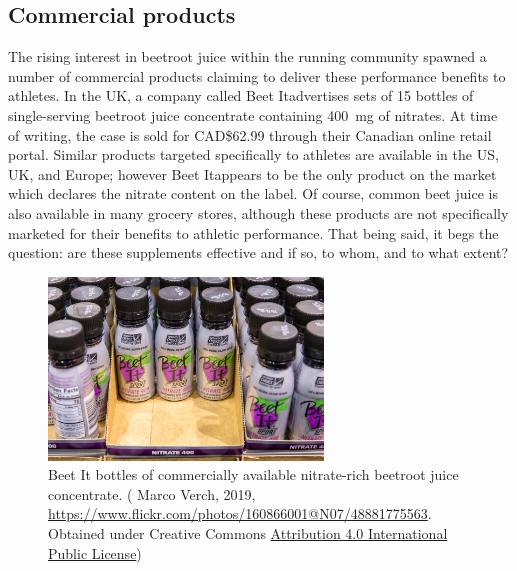     \subsection{Commercial products}
The rising interest in beetroot juice within the running community spawned a number of commercial products claiming to deliver these performance benefits to athletes. In the UK, a company called Beet It\textregistered advertises sets of 15 bottles of single-serving beetroot juice concentrate containing \SI{400}{mg} of nitrates. At time of writing, the case is sold for CAD\$62.99 through their Canadian online retail portal. Similar products targeted specifically to athletes are available in the US, UK, and Europe; however Beet It\textregistered appears to be the only product on the market which declares the nitrate content on the label. Of course, common beet juice is also available in many grocery stores, although these products are not specifically marketed for their benefits to athletic performance. That being said, it begs the question: are these supplements effective and if so, to whom, and to what extent?
\begin{figure}
    \centering
    \includegraphics[width=0.65\textwidth]{assets/beetit.jpg}
    \caption{Beet It\textregistered{} bottles of commercially available nitrate-rich beetroot juice concentrate. (\textcopyright{} Marco Verch, 2019, \url{https://www.flickr.com/photos/160866001@N07/48881775563}. Obtained under Creative Commons \href{https://creativecommons.org/licenses/by/4.0/legalcode}{Attribution 4.0 International Public License})}
    \label{fig:beetit}
\end{figure}